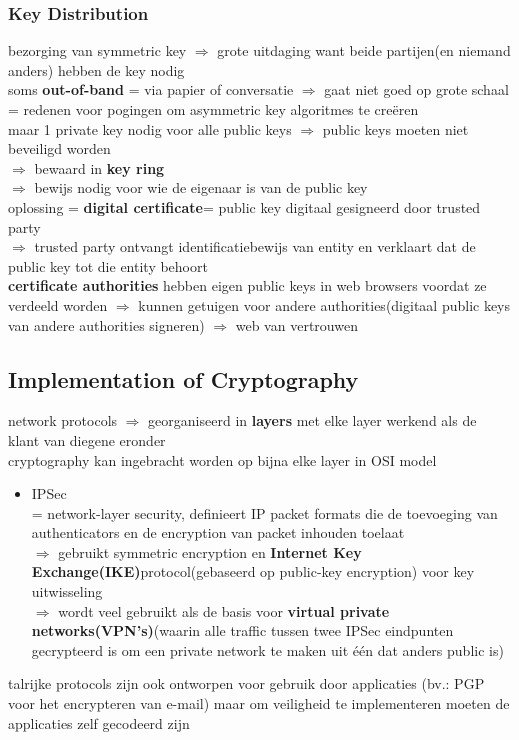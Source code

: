 \documentclass{report}
\begin{document}
\subsubsection{Key Distribution}
bezorging van symmetric key $\Rightarrow$ grote uitdaging want beide partijen(en niemand anders) hebben de key nodig
\\soms \textbf{out-of-band} = via papier of conversatie $\Rightarrow$ gaat niet goed op grote schaal
\\= redenen voor pogingen om asymmetric key algoritmes te cre\"eren
\\ maar 1 private key nodig voor alle public keys $\Rightarrow$ public keys moeten niet beveiligd worden
\\ $\Rightarrow$ bewaard in \textbf{key ring}
\\ $\Rightarrow$ bewijs nodig voor wie de eigenaar is van de public key
\\ oplossing = \textbf{digital certificate}= public key digitaal gesigneerd door trusted party
\\$\Rightarrow$ trusted party ontvangt identificatiebewijs van entity en verklaart dat de public key tot die entity behoort
\\\textbf{certificate authorities} hebben eigen public keys in web browsers voordat ze verdeeld worden $\Rightarrow$ kunnen getuigen voor andere authorities(digitaal public keys van andere authorities signeren) $\Rightarrow$ web van vertrouwen

\subsection{Implementation of Cryptography}
network protocols $\Rightarrow$ georganiseerd in \textbf{layers} met elke layer werkend als de klant van diegene eronder
\\cryptography kan ingebracht worden op bijna elke layer in OSI model
\begin{itemize}
\item IPSec 
\\ = network-layer security, definieert IP packet formats die de toevoeging van authenticators en de encryption van packet inhouden toelaat
\\$\Rightarrow$ gebruikt symmetric encryption en \textbf{Internet Key Exchange(IKE)}protocol(gebaseerd op public-key encryption) voor key uitwisseling
\\$\Rightarrow$ wordt veel gebruikt als de basis voor \textbf{virtual private networks(VPN's)}(waarin alle traffic tussen twee IPSec eindpunten gecrypteerd is om een private network te maken uit \'e\'en dat anders public is)
\end{itemize}
talrijke protocols zijn ook ontworpen voor gebruik door applicaties (bv.: PGP voor het encrypteren van e-mail) maar om veiligheid te implementeren moeten de applicaties zelf gecodeerd zijn
\end{document}
